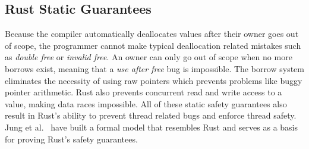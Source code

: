 \subsection{Rust Static Guarantees}
Because the compiler automatically deallocates values after their owner goes out of scope, the programmer cannot make typical deallocation related mistakes such as \textit{double free} or \textit{invalid free}.
An owner can only go out of scope when no more borrows exist, meaning that a \textit{use after free} bug is impossible.
The borrow system eliminates the necessity of using raw pointers which prevents problems like buggy pointer arithmetic.
Rust also prevents concurrent read and write access to a value, making data races impossible.
All of these static safety guarantees also result in Rust's ability to prevent thread related bugs and enforce thread safety.
Jung et al.\ \cite{10.1145/3158154} have built a formal model that resembles Rust and serves as a basis for proving Rust's safety guarantees.

